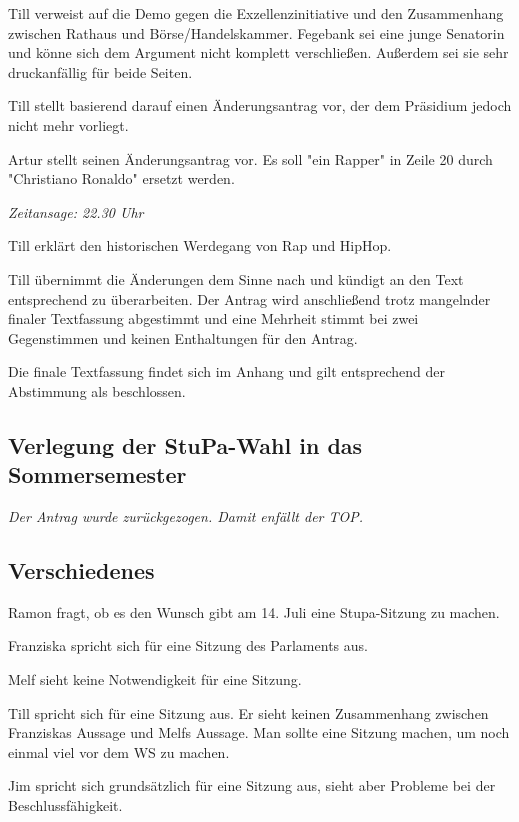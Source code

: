 \documentclass[ngerman,headheight=70pt]{scrartcl}
\begin{document}
    Till verweist auf die Demo gegen die Exzellenzinitiative und den Zusammenhang
    zwischen Rathaus und Börse/Handelskammer. Fegebank sei eine junge Senatorin
    und könne sich dem Argument nicht komplett verschließen. Außerdem sei sie
    sehr druckanfällig für beide Seiten.

    Till stellt basierend darauf einen Änderungsantrag vor, der dem Präsidium
    jedoch nicht mehr vorliegt.

    Artur stellt seinen Änderungsantrag vor.
    Es soll "ein Rapper" in Zeile 20 durch "Christiano Ronaldo" ersetzt werden.

    \textit{Zeitansage: 22.30 Uhr}

    Till erklärt den historischen Werdegang von Rap und HipHop.

    Till übernimmt die Änderungen dem Sinne nach und kündigt an den Text entsprechend
    zu überarbeiten. Der Antrag wird anschließend trotz mangelnder finaler Textfassung
    abgestimmt und eine Mehrheit stimmt bei zwei Gegenstimmen und keinen Enthaltungen
    für den Antrag.

    Die finale Textfassung findet sich im Anhang und gilt entsprechend der Abstimmung
    als beschlossen.

    \subsection{Verlegung der StuPa-Wahl in das Sommersemester}

    \textit{Der Antrag wurde zurückgezogen. Damit enfällt der TOP.}

    \subsection{Verschiedenes}

    Ramon fragt, ob es den Wunsch gibt am 14. Juli eine Stupa-Sitzung zu machen.

    Franziska spricht sich für eine Sitzung des Parlaments aus.

    Melf sieht keine Notwendigkeit für eine Sitzung.

    Till spricht sich für eine Sitzung aus. Er sieht keinen Zusammenhang
    zwischen Franziskas Aussage und Melfs Aussage. Man sollte eine Sitzung machen,
    um noch einmal viel vor dem WS zu machen.

    Jim spricht sich grundsätzlich für eine Sitzung aus, sieht aber Probleme
    bei der Beschlussfähigkeit.
\end{document}
